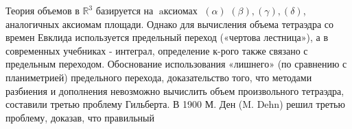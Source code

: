 \documentclass[10pt]{article}
\begin{document}
Теория объемов в $\mathbb{R}^{3}$ базируется на $\operatorname{aксиомах~}(\alpha)$ $(\beta),(\gamma),(\delta)$, аналогичных аксиомам площади. Однако для вычисления объема тетраэдра со времен Евклида используется предельный переход («чертова лестница»), а в современных учебниках - интеграл, определение к-рого также связано с предельным переходом. Обоснование использования «лишнего» (по сравнению с планиметрией) предельного перехода, доказательство того, что методами разбиения и дополнения невозможно вычислить объем произвольного тетраэдра, составили третью проблему Гильберта. В 1900 М. Ден (M. Dehn) решил третью проблему, доказав, что правильный
\end{document}
